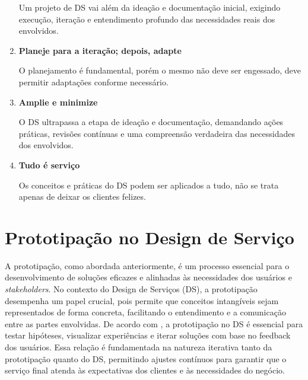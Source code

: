 \begin{enumerate}
	Um projeto de DS vai além da ideação e documentação inicial, exigindo execução, iteração e entendimento profundo das necessidades reais dos envolvidos.
	
	\item \textbf{Planeje para a iteração; depois, adapte}
	
	O planejamento é fundamental, porém o mesmo não deve ser engessado, deve permitir adaptações conforme necessário.
	
	\item \textbf{Amplie e minimize}
	
	O DS ultrapassa a etapa de ideação e documentação, demandando ações práticas, revisões contínuas e uma compreensão verdadeira das necessidades dos envolvidos.
	
	\item \textbf{Tudo é serviço}
	
	Os conceitos e práticas do DS podem ser aplicados a tudo, não se trata apenas de deixar os clientes felizes.
	
\end{enumerate}

\section{Prototipação no Design de Serviço}

A prototipação, como abordada anteriormente, é um processo essencial para o desenvolvimento de soluções eficazes e alinhadas às necessidades dos usuários e \textit{stakeholders}. No contexto do Design de Serviços (DS), a prototipação desempenha um papel crucial, pois permite que conceitos intangíveis sejam representados de forma concreta, facilitando o entendimento e a comunicação entre as partes envolvidas. De acordo com , a prototipação no DS é essencial para testar hipóteses, visualizar experiências e iterar soluções com base no feedback dos usuários. Essa relação é fundamentada na natureza iterativa tanto da prototipação quanto do DS, permitindo ajustes contínuos para garantir que o serviço final atenda às expectativas dos clientes e às necessidades do negócio.


